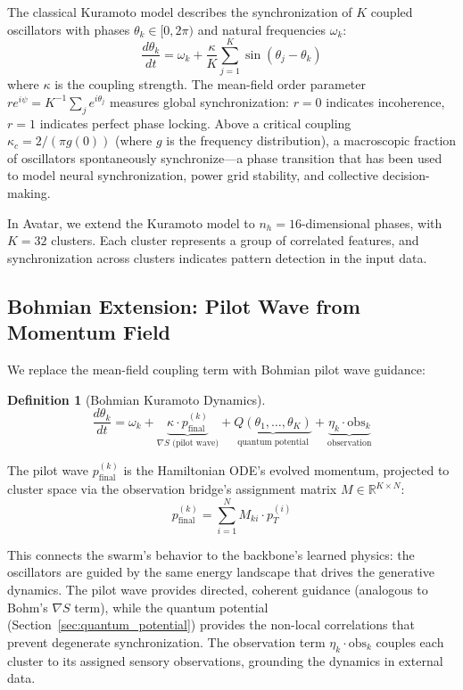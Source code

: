 \documentclass[11pt,a4paper,twocolumn]{article}
\newtheorem{definition}{Definition}
\begin{document}
The classical Kuramoto model describes the synchronization of $K$ coupled oscillators with phases $\theta_k \in [0, 2\pi)$ and natural frequencies $\omega_k$:
\begin{equation}
\frac{d\theta_k}{dt} = \omega_k + \frac{\kappa}{K} \sum_{j=1}^{K} \sin(\theta_j - \theta_k)
\label{eq:kuramoto_classic}
\end{equation}
where $\kappa$ is the coupling strength.
The mean-field order parameter $r e^{i\psi} = K^{-1} \sum_j e^{i\theta_j}$ measures global synchronization: $r = 0$ indicates incoherence, $r = 1$ indicates perfect phase locking.
Above a critical coupling $\kappa_c = 2/(\pi g(0))$ (where $g$ is the frequency distribution), a macroscopic fraction of oscillators spontaneously synchronize---a phase transition that has been used to model neural synchronization, power grid stability, and collective decision-making.

In Avatar, we extend the Kuramoto model to $n_h = 16$-dimensional phases, with $K = 32$ clusters.
Each cluster represents a group of correlated features, and synchronization across clusters indicates pattern detection in the input data.

\subsection{Bohmian Extension: Pilot Wave from Momentum Field}

We replace the mean-field coupling term with Bohmian pilot wave guidance:
\begin{definition}[Bohmian Kuramoto Dynamics]
\begin{equation}
\frac{d\theta_k}{dt} = \omega_k + \underbrace{\kappa \cdot p_{\mathrm{final}}^{(k)}}_{\nabla S \text{ (pilot wave)}} + \underbrace{Q(\theta_1, \ldots, \theta_K)}_{\text{quantum potential}} + \underbrace{\eta_k \cdot \mathrm{obs}_k}_{\text{observation}}
\label{eq:bohmian_kuramoto}
\end{equation}
\end{definition}

The pilot wave $p_{\mathrm{final}}^{(k)}$ is the Hamiltonian ODE's evolved momentum, projected to cluster space via the observation bridge's assignment matrix $M \in \mathbb{R}^{K \times N}$:
\begin{equation}
p_{\mathrm{final}}^{(k)} = \sum_{i=1}^{N} M_{ki} \cdot p_T^{(i)}
\label{eq:pilot_projection}
\end{equation}

This connects the swarm's behavior to the backbone's learned physics: the oscillators are guided by the same energy landscape that drives the generative dynamics.
The pilot wave provides directed, coherent guidance (analogous to Bohm's $\nabla S$ term), while the quantum potential (Section~\ref{sec:quantum_potential}) provides the non-local correlations that prevent degenerate synchronization.
The observation term $\eta_k \cdot \mathrm{obs}_k$ couples each cluster to its assigned sensory observations, grounding the dynamics in external data.
\end{document}
